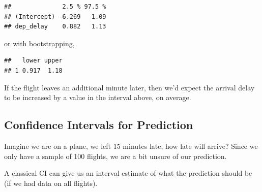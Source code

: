 \documentclass[]{book}
\newenvironment{Shaded}{\begin{snugshade}}{\end{snugshade}}
\newcommand{\CommentTok}[1]{\textcolor[rgb]{0.56,0.35,0.01}{\textit{#1}}}
\newcommand{\DataTypeTok}[1]{\textcolor[rgb]{0.13,0.29,0.53}{#1}}
\newcommand{\DecValTok}[1]{\textcolor[rgb]{0.00,0.00,0.81}{#1}}
\newcommand{\KeywordTok}[1]{\textcolor[rgb]{0.13,0.29,0.53}{\textbf{#1}}}
\newcommand{\NormalTok}[1]{#1}
\newcommand{\OperatorTok}[1]{\textcolor[rgb]{0.81,0.36,0.00}{\textbf{#1}}}
\newcommand{\OtherTok}[1]{\textcolor[rgb]{0.56,0.35,0.01}{#1}}
\newcommand{\StringTok}[1]{\textcolor[rgb]{0.31,0.60,0.02}{#1}}
\begin{document}
\begin{verbatim}
##              2.5 % 97.5 %
## (Intercept) -6.269   1.09
## dep_delay    0.882   1.13
\end{verbatim}

or with bootstrapping,

\begin{Shaded}
\end{Shaded}

\begin{verbatim}
##   lower upper
## 1 0.917  1.18
\end{verbatim}

If the flight leaves an additional minute later, then we'd expect the arrival delay to be increased by a value in the interval above, on average.

\hypertarget{confidence-intervals-for-prediction}{%
\subsection{Confidence Intervals for Prediction}\label{confidence-intervals-for-prediction}}

Imagine we are on a plane, we left 15 minutes late, how late will arrive? Since we only have a sample of 100 flights, we are a bit unsure of our prediction.

A classical CI can give us an interval estimate of what the prediction should be (if we had data on all flights).
\end{document}
